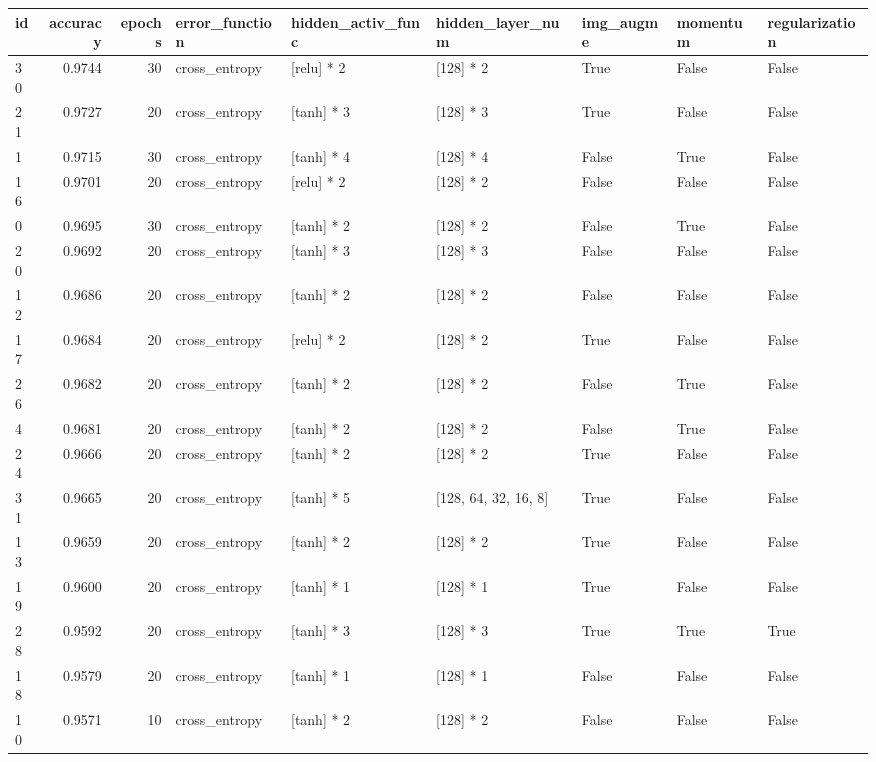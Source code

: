 \documentclass[11pt, a4paper]{article}
\begin{document}
\begin{center}
    \begin{adjustbox}{angle=90}
    \begin{tabular}{lrrllllll}
    \hline
   \textbf{id} & \textbf{accuracy} & \textbf{epochs} & \textbf{error\_function} & \textbf{hidden\_activ\_func} & \textbf{hidden\_layer\_num} & \textbf{img\_augme} & \textbf{momentum} & \textbf{regularization} \\
    \hline 
    30 & 0.9744 & 30 & cross\_entropy & [relu] * 2 & [128] * 2 & True & False & False \\
    21 & 0.9727 & 20 & cross\_entropy & [tanh] * 3 & [128] * 3 & True & False & False \\ 
    1 & 0.9715 & 30 & cross\_entropy & [tanh] * 4 & [128] * 4 & False & True & False \\ 
    16 & 0.9701 & 20 & cross\_entropy & [relu] * 2 & [128] * 2 & False & False & False \\ 
    0 & 0.9695 & 30 & cross\_entropy & [tanh] * 2 & [128] * 2 & False & True & False \\ 
    20 & 0.9692 & 20 & cross\_entropy & [tanh] * 3 & [128] * 3 & False & False & False \\ 
    12 & 0.9686 & 20 & cross\_entropy & [tanh] * 2 & [128] * 2 & False & False & False \\ 
    17 & 0.9684 & 20 & cross\_entropy & [relu] * 2 & [128] * 2 & True & False & False \\ 
    26 & 0.9682 & 20 & cross\_entropy & [tanh] * 2 & [128] * 2 & False & True & False \\ 
    4 & 0.9681 & 20 & cross\_entropy & [tanh] * 2 & [128] * 2 & False & True & False \\ 
    24 & 0.9666 & 20 & cross\_entropy & [tanh] * 2 & [128] * 2 & True & False & False \\ 
    31 & 0.9665 & 20 & cross\_entropy & [tanh] * 5 & [128, 64, 32, 16, 8] & True & False & False \\ 
    13 & 0.9659 & 20 & cross\_entropy & [tanh] * 2 & [128] * 2 & True & False & False \\ 
    19 & 0.9600 & 20 & cross\_entropy & [tanh] * 1 & [128] * 1 & True & False & False \\ 
    28 & 0.9592 & 20 & cross\_entropy & [tanh] * 3 & [128] * 3 & True & True & True \\ 
    18 & 0.9579 & 20 & cross\_entropy & [tanh] * 1 & [128] * 1 & False & False & False \\ 
    10 & 0.9571 & 10 & cross\_entropy & [tanh] * 2 & [128] * 2 & False & False & False \\ 

\end{tabular}
\end{adjustbox}
\end{center}
\end{document}
